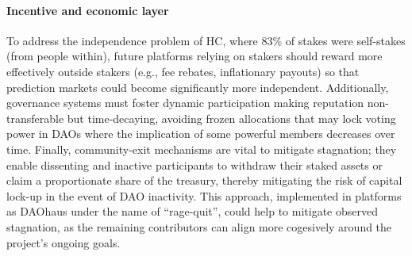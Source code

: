 \documentclass[10pt,lineno]{wlpeerj}
\begin{document}




\paragraph{Incentive and economic layer}

To address the independence problem of HC, where 83\% of stakes were self-stakes (from people within), future platforms relying on stakers should reward more effectively outside stakers (e.g., fee rebates, inflationary payouts) so that prediction markets could become significantly more independent.
Additionally, governance systems must foster dynamic participation making reputation non-transferable but time-decaying, avoiding frozen allocations that may lock voting power in DAOs where the implication of some powerful members decreases over time.
Finally, community-exit mechanisms are vital to mitigate stagnation; they enable dissenting and inactive participants to withdraw their staked assets or claim a proportionate share of the treasury, thereby mitigating the risk of capital lock-up in the event of DAO inactivity. This approach, implemented in platforms as DAOhaus under the name of ``rage-quit'', could help to mitigate observed stagnation, as the remaining contributors can align more cogesively around the project's ongoing goals.

\end{document}

